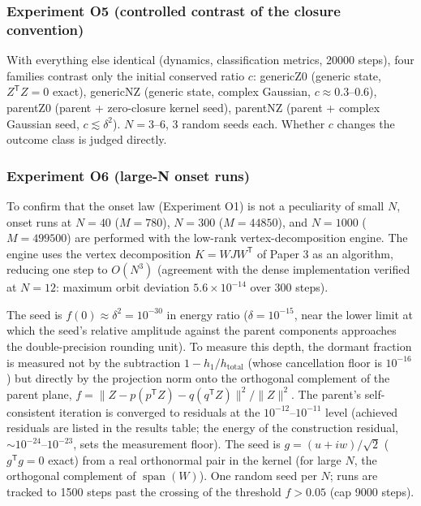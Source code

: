 \documentclass[
  a4paper,
]{article}
\begin{document}
\subsubsection{Experiment O5 (controlled contrast of the closure
convention)}\label{experiment-o5-controlled-contrast-of-the-closure-convention}

With everything else identical (dynamics, classification metrics, 20000
steps), four families contrast only the initial conserved ratio \(c\):
genericZ0 (generic state, \(Z^{\mathsf T}Z=0\) exact), genericNZ
(generic state, complex Gaussian, \(c\approx0.3\)--\(0.6\)), parentZ0
(parent + zero-closure kernel seed), parentNZ (parent + complex Gaussian
seed, \(c\lesssim\delta^2\)). \(N=3\)--\(6\), 3 random seeds each.
Whether \(c\) changes the outcome class is judged directly.

\subsubsection{Experiment O6 (large-N onset
runs)}\label{experiment-o6-large-n-onset-runs}

To confirm that the onset law (Experiment O1) is not a peculiarity of
small \(N\), onset runs at \(N=40\) (\(M=780\)), \(N=300\)
(\(M=44850\)), and \(N=1000\) (\(M=499500\)) are performed with the
low-rank vertex-decomposition engine. The engine uses the vertex
decomposition \(K=WJW^{\mathsf T}\) of Paper 3 as an algorithm, reducing
one step to \(O(N^3)\) (agreement with the dense implementation verified
at \(N=12\): maximum orbit deviation \(5.6\times10^{-14}\) over 300
steps).

The seed is \(f(0)\approx\delta^2=10^{-30}\) in energy ratio
(\(\delta=10^{-15}\), near the lower limit at which the seed's relative
amplitude against the parent components approaches the double-precision
rounding unit). To measure this depth, the dormant fraction is measured
not by the subtraction \(1-h_1/h_{\mathrm{total}}\) (whose cancellation
floor is \(10^{-16}\)) but directly by the projection norm onto the
orthogonal complement of the parent plane,
\(f=\lVert Z-p(p^{\mathsf T}Z)-q(q^{\mathsf T}Z)\rVert^2/\lVert Z\rVert^2\).
The parent's self-consistent iteration is converged to residuals at the
\(10^{-12}\)--\(10^{-11}\) level (achieved residuals are listed in the
results table; the energy of the construction residual,
\(\sim10^{-24}\)--\(10^{-23}\), sets the measurement floor). The seed is
\(g=(u+iw)/\sqrt2\) (\(g^{\mathsf T}g=0\) exact) from a real orthonormal
pair in the kernel (for large \(N\), the orthogonal complement of
\(\operatorname{span}(W)\)). One random seed per \(N\); runs are tracked
to 1500 steps past the crossing of the threshold \(f>0.05\) (cap 9000
steps).
\end{document}

